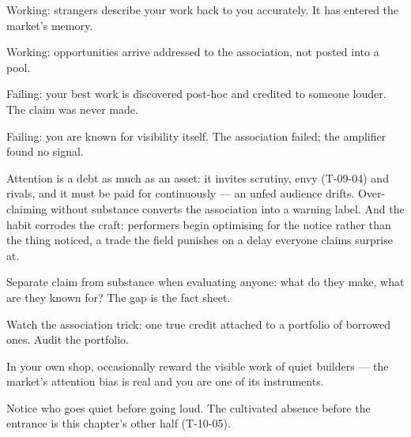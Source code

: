 \begin{feedback}
  \item Working: strangers describe your work back to you accurately. It has entered the market's memory.
  \item Working: opportunities arrive addressed to the association, not posted into a pool.
  \item Failing: your best work is discovered post-hoc and credited to someone louder. The claim was never made.
  \item Failing: you are known for visibility itself. The association failed; the amplifier found no signal.
\end{feedback}
\begin{failure}
Attention is a debt as much as an asset: it invites scrutiny, envy (T-09-04) and rivals, and it must be paid for continuously --- an unfed audience drifts. Over-claiming without substance converts the association into a warning label. And the habit corrodes the craft: performers begin optimising for the notice rather than the thing noticed, a trade the field punishes on a delay everyone claims surprise at.
\end{failure}
\begin{countermeasures}
  \item Separate claim from substance when evaluating anyone: what do they make, what are they known for? The gap is the fact sheet.
  \item Watch the association trick: one true credit attached to a portfolio of borrowed ones. Audit the portfolio.
  \item In your own shop, occasionally reward the visible work of quiet builders --- the market's attention bias is real and you are one of its instruments.
  \item Notice who goes quiet before going loud. The cultivated absence before the entrance is this chapter's other half (T-10-05).
\end{countermeasures}

\seesources
{}
